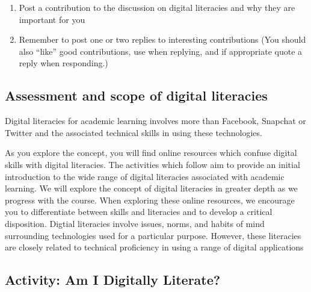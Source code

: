 \documentclass[
]{book}
\providecommand{\tightlist}{%
  \setlength{\itemsep}{0pt}\setlength{\parskip}{0pt}}
\theoremstyle{definition}
\theoremstyle{definition}
\theoremstyle{definition}
\theoremstyle{definition}
\theoremstyle{remark}
\begin{document}
\begin{reflect}
\begin{enumerate}
\def\labelenumi{\arabic{enumi}.}
\tightlist
\item
  Post a contribution to the discussion on digital literacies and why they are important for you
\item
  Remember to post one or two replies to interesting contributions (You should also ``like'' good contributions, use \citet{username} when replying, and if appropriate quote a reply when responding.)
\end{enumerate}
\end{reflect}

\hypertarget{assessment-and-scope-of-digital-literacies}{%
\subsection{Assessment and scope of digital literacies}\label{assessment-and-scope-of-digital-literacies}}

Digital literacies for academic learning involves more than Facebook, Snapchat or Twitter and the associated technical skills in using these technologies.

As you explore the concept, you will find online resources which confuse digital skills with digital literacies. The activities which follow aim to provide an initial introduction to the wide range of digital literacies associated with academic learning. We will explore the concept of digital literacies in greater depth as we progress with the course. When exploring these online resources, we encourage you to differentiate between skills and literacies and to develop a critical disposition. Digtial literacies involve issues, norms, and habits of mind surrounding technologies used for a particular purpose. However, these literacies are closely related to technical proficiency in using a range of digital applications

\hypertarget{activity-am-i-digitally-literate}{%
\subsection*{Activity: Am I Digitally Literate?}\label{activity-am-i-digitally-literate}}
\end{document}
